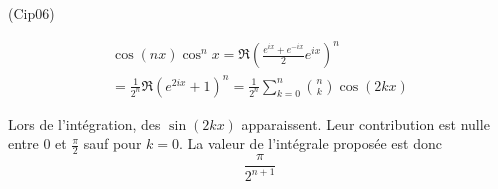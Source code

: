 \begin{tiny}(Cip06)\end{tiny}
\begin{multline*}
 \cos(nx)\cos^nx = \Re\left(\frac{e^{ix}+e^{-ix}}{2}e^{ix} \right)^n\\
=\frac{1}{2^n}\Re(e^{2ix}+1)^n 
=\frac{1}{2^n}\sum_{k=0}^n \binom{n}{k}\cos(2kx)
\end{multline*}

Lors de l'intégration, des $\sin(2kx)$ apparaissent. Leur contribution est nulle entre $0$ et $\frac{\pi}{2}$ sauf pour $k=0$. La valeur de l'intégrale proposée est donc
\begin{displaymath}
 \frac{\pi}{2^{n+1}}
\end{displaymath}
